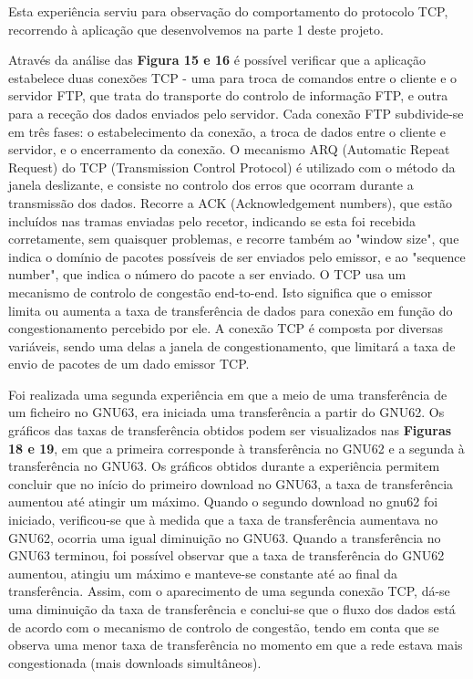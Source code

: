 \documentclass[article, a4paper, 11pt, oneside]{memoir}
\begin{document}
Esta experiência serviu para observação do comportamento do protocolo TCP, 
recorrendo à aplicação que desenvolvemos na parte 1 deste projeto. 

Através da análise das \textbf{Figura 15 e 16} é possível verificar que a aplicação estabelece duas conexões TCP - 
uma para troca de comandos entre o cliente e o servidor FTP, 
que trata do transporte do controlo de informação FTP, e outra para a receção dos dados enviados pelo servidor.
Cada conexão FTP subdivide-se em três fases: o estabelecimento da conexão, a troca de dados entre o cliente e servidor, e o encerramento da conexão.
O mecanismo ARQ (Automatic Repeat Request) do TCP (Transmission Control Protocol) é utilizado com o método da janela deslizante, 
e consiste no controlo dos erros que ocorram durante a transmissão dos dados.
Recorre a ACK (Acknowledgement numbers), que estão incluídos nas tramas enviadas pelo recetor, indicando se esta foi 
recebida corretamente, sem quaisquer problemas, e recorre também ao "window size", que indica o domínio de pacotes 
possíveis de ser enviados pelo emissor, e ao "sequence number", que indica o número do pacote a ser enviado.
O TCP usa um mecanismo de controlo de congestão end-to-end. Isto significa que o emissor limita ou aumenta a taxa de 
transferência de dados para conexão em função do congestionamento percebido por ele.
A conexão TCP é composta por diversas variáveis, sendo uma delas a janela de congestionamento, que limitará a taxa de envio de pacotes de um dado emissor TCP.

Foi realizada uma segunda experiência em que a meio de uma transferência de um ficheiro no GNU63, 
era iniciada uma transferência a partir do GNU62. Os gráficos das taxas de transferência
obtidos podem ser visualizados nas \textbf{Figuras 18 e 19}, em que a primeira corresponde à transferência no GNU62 e a segunda à transferência no GNU63.
Os gráficos obtidos durante a experiência permitem concluir que no início do primeiro download no GNU63, a taxa de transferência aumentou até atingir um máximo. 
Quando o segundo download no gnu62 foi iniciado, verificou-se que à medida que a taxa de transferência aumentava no GNU62, ocorria uma igual diminuição no GNU63. 
Quando a transferência no GNU63
terminou, foi possível observar que a taxa de transferência do GNU62 aumentou, atingiu um máximo e manteve-se constante até ao final da transferência.
Assim, com o aparecimento de uma segunda conexão TCP, dá-se uma diminuição da taxa de transferência e conclui-se que o fluxo dos dados está de acordo 
com o mecanismo de controlo de congestão, tendo em conta que se observa uma menor taxa de transferência no momento em que a rede estava mais congestionada 
(mais downloads simultâneos).
\end{document}
